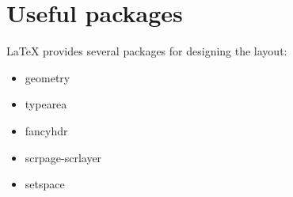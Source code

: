 \documentclass{article}
\begin{document}
\section*{Useful packages}
LaTeX provides several packages for designing the layout:

\begin{itemize}
    \item geometry
    \item typearea
    \item fancyhdr
    \item scrpage-scrlayer
    \item setspace
\end{itemize}
\end{document}

